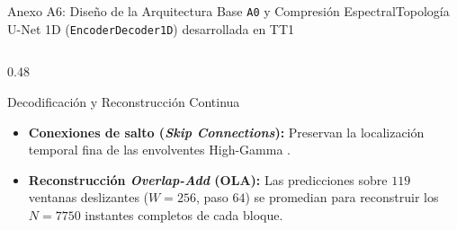 \begin{frame}{Anexo A6: Dise\~no de la Arquitectura Base \texttt{A0} y Compresi\'on Espectral}{Topolog\'ia U-Net 1D (\texttt{EncoderDecoder1D}) desarrollada en TT1 \cite{ronneberger2015unet,Lomtev2022,rodas_valencia_tpe_ecog}}
\begin{columns}[T,onlytextwidth]
    \begin{column}{0.48\textwidth}
      \begin{block}{Decodificaci\'on y Reconstrucci\'on Continua}
        \scriptsize
        \begin{itemize}\setlength{\itemsep}{3pt}
          \item \textbf{Conexiones de salto (\textit{Skip Connections}):} Preservan la localizaci\'on temporal fina de las envolventes High-Gamma \cite{ronneberger2015unet}.
          \item \textbf{Reconstrucci\'on \textit{Overlap-Add} (OLA):} Las predicciones sobre $119$ ventanas deslizantes ($W=256$, paso $64$) se promedian para reconstruir los $N=7750$ instantes completos de cada bloque.
        \end{itemize}
      \end{block}
    \end{column}
  \end{columns}
\end{frame}


\annexslidefalse
